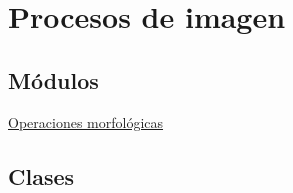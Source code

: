 \hypertarget{group___img_proc}{}\section{Procesos de imagen}
\label{group___img_proc}
\subsection*{Módulos}
\begin{DoxyCompactItemize}
\item 
\hyperlink{group___morph_oper}{Operaciones morfológicas}
\end{DoxyCompactItemize}
\subsection*{Clases}

